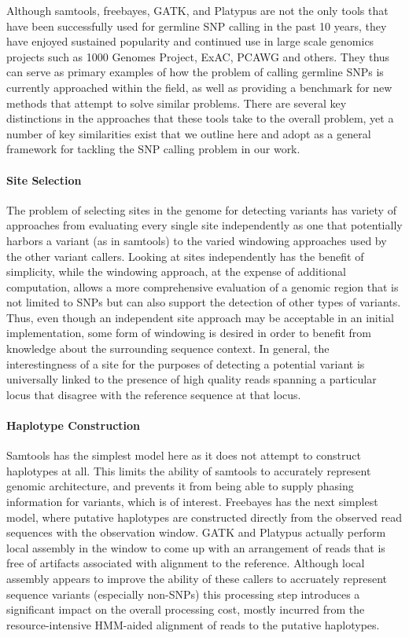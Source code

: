Although samtools, freebayes, GATK, and Platypus are not the only tools that have been successfully used for germline SNP calling in the past 10 years, they have enjoyed sustained popularity and continued use in large scale genomics projects such as 1000 Genomes Project, ExAC\autocite{lek2016analysis}, PCAWG\autocite{stein2015data} and others. They thus can serve as primary examples of how the problem of calling germline SNPs is currently approached within the field, as well as providing a benchmark for new methods that attempt to solve similar problems. There are several key distinctions in the approaches that these tools take to the overall problem, yet a number of key similarities exist that we outline here and adopt as a general framework for tackling the SNP calling problem in our work.

\paragraph{Site Selection}

The problem of selecting sites in the genome for detecting variants has variety of approaches from evaluating every single site independently as one that potentially harbors a variant (as in samtools) to the varied windowing approaches used by the other variant callers. Looking at sites independently has the benefit of simplicity, while the windowing approach, at the expense of additional computation, allows a more comprehensive evaluation of a genomic region that is not limited to SNPs but can also support the detection of other types of variants. Thus, even though an independent site approach may be acceptable in an initial implementation, some form of windowing is desired in order to benefit from knowledge about the surrounding sequence context. In general, the interestingness of a site for the purposes of detecting a potential variant is universally linked to the presence of high quality reads spanning a particular locus that disagree with the reference sequence at that locus.

\paragraph{Haplotype Construction}

Samtools has the simplest model here as it does not attempt to construct haplotypes at all. This limits the ability of samtools to accurately represent genomic architecture, and prevents it from being able to supply phasing information for variants, which is of interest. Freebayes has the next simplest model, where putative haplotypes are constructed directly from the observed read sequences with the observation window. GATK and Platypus actually perform local assembly in the window to come up with an arrangement of reads that is free of artifacts\autocite{li2014towards} associated with alignment to the reference. Although local assembly appears to improve the ability of these callers to accruately represent sequence variants (especially non-SNPs) this processing step introduces a significant impact on the overall processing cost, mostly incurred from the resource-intensive HMM-aided alignment of reads to the putative haplotypes.


